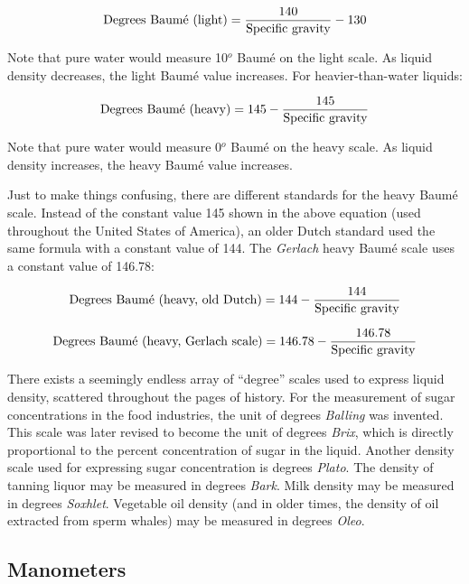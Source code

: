 $$\hbox{Degrees Baum\'e (light)} = {140 \over \hbox{Specific gravity}} - 130$$

Note that pure water would measure 10$^{o}$ Baum\'e on the light scale.  As liquid density decreases, the light Baum\'e value increases.  For heavier-than-water liquids:

$$\hbox{Degrees Baum\'e (heavy)} = 145 - {145 \over \hbox{Specific gravity}}$$

Note that pure water would measure 0$^{o}$ Baum\'e on the heavy scale.  As liquid density increases, the heavy Baum\'e value increases.  

\filbreak

Just to make things confusing, there are different standards for the heavy Baum\'e scale.  Instead of the constant value 145 shown in the above equation (used throughout the United States of America), an older Dutch standard used the same formula with a constant value of 144.  The \textit{Gerlach} heavy Baum\'e scale uses a constant value of 146.78: 

$$\hbox{Degrees Baum\'e (heavy, old Dutch)} = 144 - {144 \over \hbox{Specific gravity}}$$

$$\hbox{Degrees Baum\'e (heavy, Gerlach scale)} = 146.78 - {146.78 \over \hbox{Specific gravity}}$$

There exists a seemingly endless array of ``degree'' scales used to express liquid density, scattered throughout the pages of history.  For the measurement of sugar concentrations in the food industries, the unit of degrees \textit{Balling} was invented.  This scale was later revised to become the unit of degrees \textit{Brix}, which is directly proportional to the percent concentration of sugar in the liquid.  Another density scale used for expressing sugar concentration is degrees \textit{Plato}.  The density of tanning liquor may be measured in degrees \textit{Bark}.  Milk density may be measured in degrees \textit{Soxhlet}.  Vegetable oil density (and in older times, the density of oil extracted from sperm whales) may be measured in degrees \textit{Oleo}.                








\filbreak
\subsection{Manometers}

